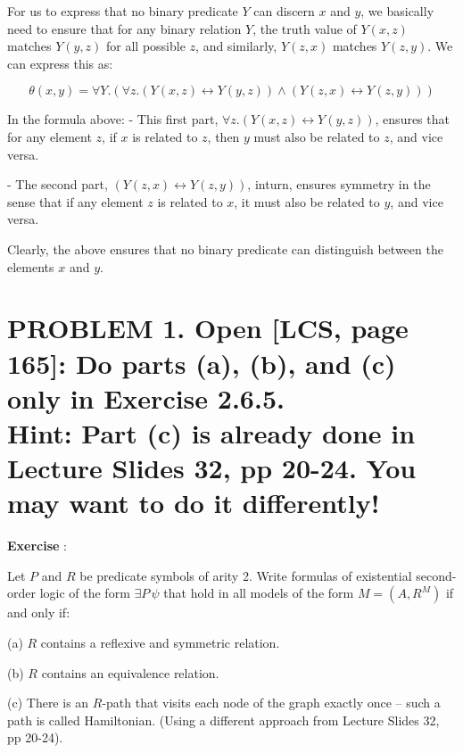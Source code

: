 \documentclass{article}
\begin{document}
For us to express that no binary predicate \( Y \) can discern \( x \) and \( y \), we basically need to ensure that 
for any binary relation \( Y \), the truth value of \( Y(x, z) \) matches \( Y(y, z) \) for all possible \( z \), 
and similarly, \( Y(z, x) \) matches \( Y(z, y) \). We can express this as:

\vspace{1em}
\[
\theta(x, y) = \forall Y. (\forall z. (Y(x, z) \leftrightarrow Y(y, z)) \land (Y(z, x) \leftrightarrow Y(z, y)))
\]

\vspace{1em}
In the formula above:
- This first part, \( \forall z. (Y(x, z) \leftrightarrow Y(y, z)) \), ensures that for any element \( z \), 
if \( x \) is related to \( z \), then \( y \) must also be related to \( z \), and vice versa.

\vspace{1em}
- The second part, \( (Y(z, x) \leftrightarrow Y(z, y)) \), inturn,  ensures symmetry in the sense that if any element \( z \) 
is related to \( x \), it must also be related to \( y \), and vice versa.

\vspace{1em}
Clearly, the above ensures that no binary predicate can distinguish between the elements \( x \) and \( y \).


\newpage

\section*{PROBLEM 1. Open [LCS, page 165]: Do parts (a), (b), and (c) only in Exercise 2.6.5.\newline\\
Hint: Part (c) is already done in Lecture Slides 32, pp 20-24. You may want to do it differently! }


\begin{mdframed}
    \textbf{Exercise }: 
    
    \vspace{1em}
    Let \( P \) and \( R \) be predicate symbols of arity 2. Write formulas of existential second-order logic of the form \( \exists P \, \psi \) that hold in all models of the form \( M = (A, R^M) \) if and only if:

    \vspace{1em}
    (a) \( R \) contains a reflexive and symmetric relation.

    \vspace{1em}
    (b) \( R \) contains an equivalence relation.

    \vspace{1em}
    (c) There is an \( R \)-path that visits each node of the graph exactly once – such a path is called Hamiltonian. 
(Using a different approach from Lecture Slides 32, pp 20-24).
\end{mdframed}
    
\end{document}
